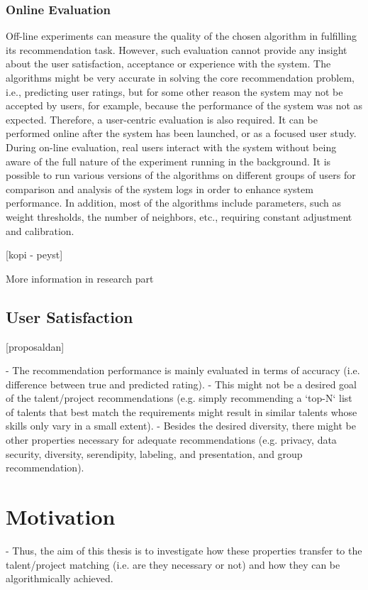 \subsubsection{Online Evaluation}
Off-line experiments can measure the quality of the chosen algorithm in fulfilling its recommendation task. However, such evaluation cannot provide any insight about the user satisfaction, acceptance or experience with the system. The algorithms might be very accurate in solving the core recommendation problem, i.e., predicting user ratings, but for some other reason the system may not be accepted by users, for example, because the performance of the system was not as expected.
Therefore, a user-centric evaluation is also required. It can be performed online after the system has been launched, or as a focused user study. During on-line evaluation, real users interact with the system without being aware of the full nature of the experiment running in the background. It is possible to run various versions of the algorithms on different groups of users for comparison and analysis of the system logs in order to enhance system performance. In addition, most of the algorithms include parameters, such as weight thresholds, the number of neighbors, etc., requiring constant adjustment and calibration.

[kopi - peyst]

More information in research part

\subsection{User Satisfaction}

[proposaldan]

- The recommendation performance is mainly evaluated in terms of accuracy (i.e. difference between true and predicted rating).
- This might not be a desired goal of the talent/project recommendations (e.g. simply recommending a `top-N` list of talents that best match the requirements might result in similar talents whose skills only vary in a small extent).
- Besides the desired diversity, there might be other properties necessary for adequate recommendations (e.g. privacy, data security, diversity, serendipity, labeling, and presentation, and group recommendation).

\section{Motivation}

- Thus, the aim of this thesis is to investigate how these properties transfer to the talent/project matching (i.e. are they necessary or not) and how they can be algorithmically achieved.

